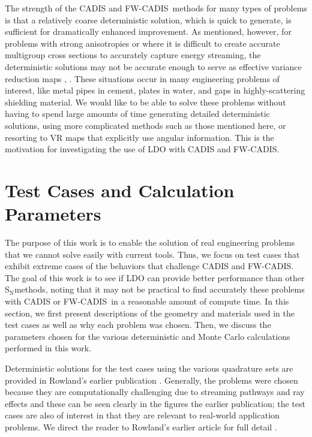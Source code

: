 \documentclass{article} %
\newcommand{\sn}{S$_\mathrm{N}$}
\newcommand{\fwc}{\mbox{FW-CADIS}}
\begin{document}
The strength of the CADIS and \fwc\ methods for many types of problems is that a relatively coarse deterministic solution, which is quick to generate, is sufficient for dramatically enhanced improvement. As mentioned, however, for problems with strong anisotropies or where it is difficult to create accurate multigroup cross sections to accurately capture energy streaming, the deterministic solutions may not be accurate enough to serve as effective variance reduction maps \cite{peplow}, \cite{wilsonslaybaugh}. These situations occur in many engineering problems of interest, like metal pipes in cement, plates in water, and gaps in highly-scattering shielding material. We would like to be able to solve these problems without having to spend large amounts of time generating detailed deterministic solutions, using more complicated methods such as those mentioned here, or resorting to VR maps that explicitly use angular information. This is the motivation for investigating the use of LDO with CADIS and \fwc.

\section{Test Cases and Calculation Parameters}

The purpose of this work is to enable the solution of real engineering problems that we cannot solve easily with current tools. Thus, we focus on test cases that exhibit extreme cases of the behaviors that challenge CADIS and \fwc. The goal of this work is to see if LDO can provide better performance than other \sn methods, noting that it may not be practical to find accurately these problems with CADIS or \fwc\ in a reasonable amount of compute time. In this section, we first present descriptions of the geometry and materials
used in the test cases as well as why each problem was chosen. Then, we
discuss the parameters chosen for the various deterministic and Monte Carlo
calculations performed in this work.

Deterministic solutions for the test cases using the various quadrature sets
are provided in Rowland's earlier publication \cite{kr18}. Generally, the
problems were chosen because they are computationally challenging due to
streaming pathways and ray effects and these can be seen clearly in the figures the earlier publication; the test cases are also of interest in
that they are relevant to real-world application problems. We direct the
reader to Rowland's earlier article for full detail \cite{kr18}.
\end{document}
